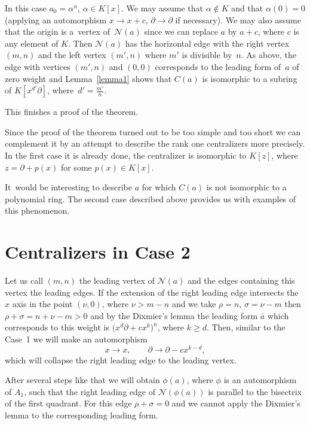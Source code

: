 \documentclass[pdftex]{sigma}
\numberwithin{equation}{section}
\newcommand{\de}{\partial}
\newcommand{\al}{\alpha}
\newcommand{\si}{\sigma}
\begin{document}
In this case $a_0 = \al^n$, $\al \in K[x]$. We may assume that $\al \not\in K$ and that $\al(0) = 0$ (applying an automorphism $x\rightarrow x + c$, $\de \rightarrow \de$ if necessary).
We may also assume that the origin is a~vertex of~${\mathcal N}(a)$ since we can replace $a$ by $a + c$, where $c$ is any element of $K$.
Then ${\mathcal N}(a)$ has the horizontal edge with the right vertex $(m,n)$ and the left vertex $(m',n)$ where
$m'$ is divisible by~$n$. As above, the edge with vertices $(m',n)$ and $(0,0)$ corresponds to the leading form of~$a$ of zero weight
and Lemma~\ref{lemma1} shows that $C(a)$ is isomorphic to a subring of $K[x^{d'}\de]$, where~$d' = \frac{m'}{n}$.

This finishes a proof of the theorem.


Since the proof of the theorem turned out to be too simple and too short we can
complement it by an attempt to describe the rank one centralizers more
precisely. In the first case it is already done, the centralizer is isomorphic
to $K[z]$, where $z = \de + p(x)$ for some $p(x) \in K[x]$.

It~would be interesting to describe $a$ for which $C(a)$ is not isomorphic to a polynomial ring. The second case described above provides us with examples of this phenomenon.

\section{Centralizers in Case 2}\label{lie}

Let us call $(m,n)$ the leading vertex of ${\mathcal N}(a)$ and the edges containing this vertex the leading edges. If the extension of the right leading edge intersects the $x$ axis in the point $(\nu, 0)$,
where $\nu > m - n$ and we take $\rho = n$, $\si = \nu - m$ then $\rho + \si = n + \nu - m > 0$ and by the Dixmier's lemma the leading form $\bar{a}$ which corresponds to this weight is $\big(x^d\de + c x^k\big)^n$, where $k \geq d$. Then, similar to the Case~1 we will make an automorphism
\[
x \to x, \qquad\de \to \de - cx^{k-d},
\]
which will collapse the right leading edge to the leading vertex.

After several steps like that we will obtain $\phi(a)$, where $\phi$ is an automorphism of $A_1$, such that the right leading edge of ${\mathcal N}(\phi(a))$ is parallel to the bisectrix of the first quadrant. For this edge $\rho + \si = 0$ and we cannot apply the Dixmier's lemma to the corresponding leading form.
\end{document}
